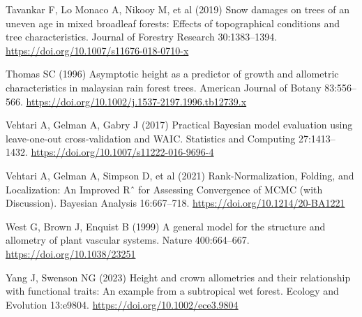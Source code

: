 \documentclass[
  12pt,
  letterpaper,
  DIV=11,
  numbers=noendperiod]{scrartcl}
\newlength{\cslhangindent}
\newenvironment{CSLReferences}[2] %
 {\begin{list}{}{%
  \setlength{\itemindent}{0pt}
  \setlength{\leftmargin}{0pt}
  \setlength{\parsep}{0pt}
  \ifodd #1
   \setlength{\leftmargin}{\cslhangindent}
   \setlength{\itemindent}{-1\cslhangindent}
  \fi
  \setlength{\itemsep}{#2\baselineskip}}}
 {\end{list}}
\begin{document}
\begin{CSLReferences}{1}{1}
Tavankar F, Lo Monaco A, Nikooy M, et al (2019) Snow damages on trees of
an uneven age in mixed broadleaf forests: Effects of topographical
conditions and tree characteristics. Journal of Forestry Research
30:1383--1394. \url{https://doi.org/10.1007/s11676-018-0710-x}

Thomas SC (1996) Asymptotic height as a predictor of growth and
allometric characteristics in malaysian rain forest trees. American
Journal of Botany 83:556--566.
\url{https://doi.org/10.1002/j.1537-2197.1996.tb12739.x}

Vehtari A, Gelman A, Gabry J (2017) Practical {Bayesian} model
evaluation using leave-one-out cross-validation and {WAIC}. Statistics
and Computing 27:1413--1432.
\url{https://doi.org/10.1007/s11222-016-9696-4}

Vehtari A, Gelman A, Simpson D, et al (2021) Rank-{Normalization},
{Folding}, and {Localization}: {An} {Improved} {Rˆ} for {Assessing}
{Convergence} of {MCMC} (with {Discussion}). Bayesian Analysis
16:667--718. \url{https://doi.org/10.1214/20-BA1221}

West G, Brown J, Enquist B (1999) A general model for the structure and
allometry of plant vascular systems. Nature 400:664--667.
\url{https://doi.org/10.1038/23251}

Yang J, Swenson NG (2023) Height and crown allometries and their
relationship with functional traits: {An} example from a subtropical wet
forest. Ecology and Evolution 13:e9804.
\url{https://doi.org/10.1002/ece3.9804}

\end{CSLReferences}
\end{document}
